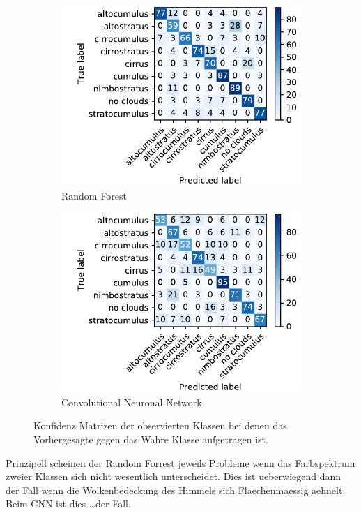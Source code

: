 \begin{figure}[h]
		\centering
		\begin{subfigure}[b]{0.49\textwidth}
				\begin{center}
						\includegraphics[width=\textwidth]{./pictures/conf_rf.pdf}
				\end{center}
				\caption{Random Forest}
				\label{fig:conf_rf}
		\end{subfigure}
		\begin{subfigure}[b]{0.49\textwidth}
				\begin{center}
						\includegraphics[width=\textwidth]{./pictures/conf_nn.pdf}
				\end{center}
				\caption{Convolutional Neuronal Network}
				\label{fig:conf_cnn}
		\end{subfigure}
		\caption{Konfidenz Matrizen der observierten Klassen bei denen das
		Vorhergesagte gegen das Wahre Klasse aufgetragen ist.}
		\label{fig:conf}
\end{figure}
Prinzipell scheinen der Random Forrest jeweils Probleme wenn das Farbspektrum
zweier Klassen sich nicht wesentlich unterscheidet.
Dies ist ueberwiegend dann der Fall wenn die Wolkenbedeckung des Himmels sich
Flaechenmaessig aehnelt. 
Beim CNN ist dies \ldots der Fall.

